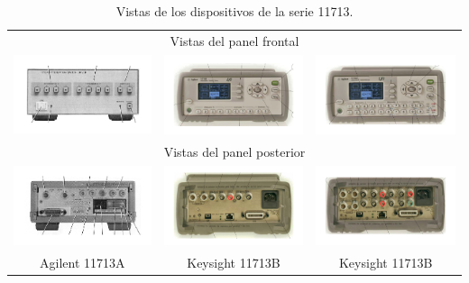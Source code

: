 \documentclass[paper=letter,oneside,fontsize=12pt, parskip=full]{article}
\begin{document}
	\begin{table}
		\begin{center}
			\begin{tabular}{ccc} 		
				\multicolumn{3}{c}{Vistas del panel frontal} \\
				\includegraphics[width=5cm]{Imagenes/front-11713A.pdf} &
				\includegraphics[width=5cm]{Imagenes/front-11713B.pdf} &
				\includegraphics[width=5cm]{Imagenes/front-11713C.pdf} \\
				\multicolumn{3}{c}{Vistas del panel posterior} \\
				\includegraphics[width=5cm]{Imagenes/back-11713A.pdf} &
				\includegraphics[width=5cm]{Imagenes/back-11713B.pdf} &
				\includegraphics[width=5cm]{Imagenes/back-11713C.pdf} \\			
				Agilent 11713A & Keysight 11713B & Keysight 11713B \\
			\end{tabular}
			\caption{Vistas de los dispositivos de la serie 11713.}
		\end{center}
	\end{table}
\end{document}

